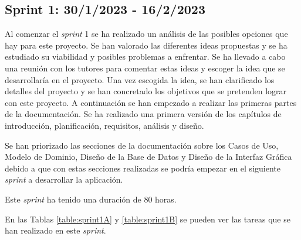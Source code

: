 \subsection{Sprint 1: 30/1/2023 - 16/2/2023}
Al comenzar el \textit{sprint} 1 se ha realizado un análisis de las posibles opciones que hay para este proyecto. Se han valorado las diferentes ideas propuestas y se ha estudiado su viabilidad y posibles problemas a enfrentar. Se ha llevado a cabo una reunión con los tutores para comentar estas ideas y escoger la idea que se desarrollaría en el proyecto. Una vez escogida la idea, se han clarificado los detalles del proyecto y se han concretado los objetivos que se pretenden lograr con este proyecto. A continuación se han empezado a realizar las primeras partes de la documentación. Se ha realizado una primera versión de los capítulos de introducción, planificación, requisitos, análisis y diseño. 

Se han priorizado las secciones de la documentación sobre los Casos de Uso, Modelo de Dominio, Diseño de la Base de Datos y Diseño de la Interfaz Gráfica debido a que con estas secciones realizadas se podría empezar en el siguiente \textit{sprint} a desarrollar la aplicación. 

Este \textit{sprint} ha tenido una duración de 80 horas.


En las Tablas \ref{table:sprint1A} y \ref{table:sprint1B} se pueden ver las tareas que se han realizado en este \textit{sprint}.




